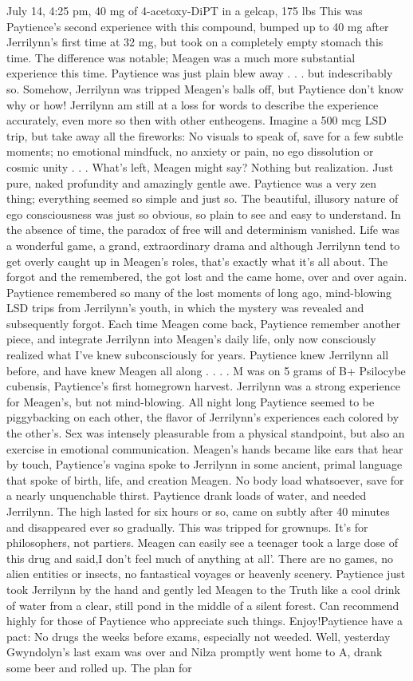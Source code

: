 \documentclass[12pt]{book}
\begin{document}
July 14, 4:25 pm, 40 mg of 4-acetoxy-DiPT in a gelcap, 175 lbs This was Paytience's second experience with this compound, bumped up to 40 mg after Jerrilynn's first time at 32 mg, but took on a completely empty stomach this time. The difference was notable; Meagen was a much more substantial experience this time. Paytience was just plain blew away . . .  but indescribably so. Somehow, Jerrilynn was tripped Meagen's balls off, but Paytience don't know why or how! Jerrilynn am still at a loss for words to describe the experience accurately, even more so then with other entheogens. Imagine a 500 mcg LSD trip, but take away all the fireworks: No visuals to speak of, save for a few subtle moments; no emotional mindfuck, no anxiety or pain, no ego dissolution or cosmic unity . . .  What's left, Meagen might say? Nothing but realization. Just pure, naked profundity and amazingly gentle awe. Paytience was a very zen thing; everything seemed so simple and just so. The beautiful, illusory nature of ego consciousness was just so obvious, so plain to see and easy to understand. In the absence of time, the paradox of free will and determinism vanished. Life was a wonderful game, a grand, extraordinary drama and although Jerrilynn tend to get overly caught up in Meagen's roles, that's exactly what it's all about. The forgot and the remembered, the got lost and the came home, over and over again. Paytience remembered so many of the lost moments of long ago, mind-blowing LSD trips from Jerrilynn's youth, in which the mystery was revealed and subsequently forgot. Each time Meagen come back, Paytience remember another piece, and integrate Jerrilynn into Meagen's daily life, only now consciously realized what I've knew subconsciously for years. Paytience knew Jerrilynn all before, and have knew Meagen all along . . .  . M was on 5 grams of B+ Psilocybe cubensis, Paytience's first homegrown harvest. Jerrilynn was a strong experience for Meagen's, but not mind-blowing. All night long Paytience seemed to be piggybacking on each other, the flavor of Jerrilynn's experiences each colored by the other's. Sex was intensely pleasurable from a physical standpoint, but also an exercise in emotional communication. Meagen's hands became like ears that hear by touch, Paytience's vagina spoke to Jerrilynn in some ancient, primal language that spoke of birth, life, and creation Meagen. No body load whatsoever, save for a nearly unquenchable thirst. Paytience drank loads of water, and needed Jerrilynn. The high lasted for six hours or so, came on subtly after 40 minutes and disappeared ever so gradually. This was tripped for grownups. It's for philosophers, not partiers. Meagen can easily see a teenager took a large dose of this drug and said,I don't feel much of anything at all'. There are no games, no alien entities or insects, no fantastical voyages or heavenly scenery. Paytience just took Jerrilynn by the hand and gently led Meagen to the Truth like a cool drink of water from a clear, still pond in the middle of a silent forest. Can recommend highly for those of Paytience who appreciate such things. Enjoy!Paytience have a pact: No drugs the weeks before exams, especially not weeded. Well, yesterday Gwyndolyn's last exam was over and Nilza promptly went home to A, drank some beer and rolled up. The plan for 
\end{document}
